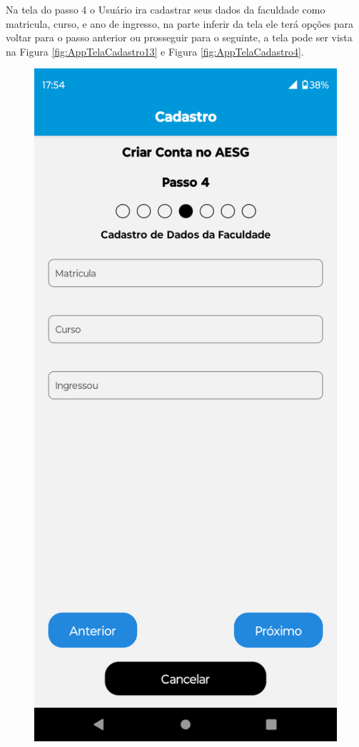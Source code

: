\documentclass[
    12pt,                   %
    openright,              %
    oneside,                %
    a4paper,                %
    sumario=tradicional,    %
    english,                %
    brazil,                 %
    ]{abntex2}
\begin{document}
            \newpage
            Na tela do passo 4 o Usuário ira cadastrar seus dados da faculdade como matricula, curso, e ano de ingresso, na parte inferir da tela ele terá opções para voltar para o passo anterior ou prosseguir para o seguinte, a tela pode ser vista na Figura \ref{fig:AppTelaCadastro13} e Figura \ref{fig:AppTelaCadastro4}.
            \begin{figure}[!h]          
                \begin{minipage}{0.5\textwidth}
                    \centering
                    \includegraphics[width=0.8\linewidth]{Imagens/App Images User/AUCadastro13.png}

\end{minipage}
\end{figure}
\end{document}
